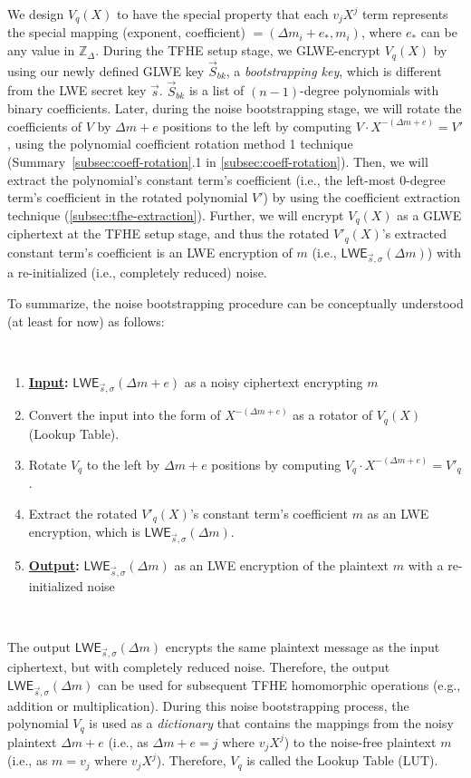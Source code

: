 We design $V_q(X)$ to have the special property that each $v_{j}X^{j}$ term represents the special mapping (exponent, coefficient) $= (\Delta m_i + e_{*}, m_i)$, where $e_*$ can be any value in $\mathbb{Z}_{\Delta}$. During the TFHE setup stage, we GLWE-encrypt $V_q(X)$ by using our newly defined GLWE key $\vec{S}_{bk}$, a \textit{bootstrapping key}, which is different from the LWE secret key $\vec{s}$. $\vec{S}_{bk}$ is a list of $(n-1)$-degree polynomials with binary coefficients. Later, during the noise bootstrapping stage, we will rotate the coefficients of $V$ by $\Delta m + e$ positions to the left by computing $V \cdot X^{-(\Delta m + e)} = V'$, using the polynomial coefficient rotation method 1 technique (Summary~\ref*{subsec:coeff-rotation}.1 in \autoref{subsec:coeff-rotation}). Then, we will extract the polynomial's constant term's coefficient (i.e., the left-most 0-degree term's coefficient in the rotated polynomial $V'$) by using the coefficient extraction technique (\autoref{subsec:tfhe-extraction}). Further, we will encrypt $V_q(X)$ as a GLWE ciphertext at the TFHE setup stage, and thus the rotated $V'_q(X)$'s extracted constant term's coefficient is an LWE encryption of $m$ (i.e., $\textsf{LWE}_{\vec{s}, \sigma}(\Delta m)$) with a re-initialized (i.e., completely reduced) noise. 

To summarize, the noise bootstrapping procedure can be conceptually understood (at least for now) as follows: 

$ $

\begin{enumerate}
\item \textbf{\underline{Input}:} $\textsf{LWE}_{\vec{s}, \sigma}(\Delta m + e)$ as a noisy ciphertext encrypting $m$
\item Convert the input into the form of $X^{-(\Delta m + e)}$ as a rotator of $V_q(X)$ (Lookup Table).
\item Rotate $V_q$ to the left by $\Delta m + e$ positions by computing $V_q \cdot X^{-(\Delta m + e)} = V'_q$.
\item Extract the rotated $V'_q(X)$'s constant term's coefficient $m$ as an LWE encryption, which is $\textsf{LWE}_{\vec{s}, \sigma}(\Delta m)$.
\item \textbf{\underline{Output}:} $\textsf{LWE}_{\vec{s}, \sigma}(\Delta m)$ as an LWE encryption of the plaintext $m$ with a re-initialized noise
\end{enumerate}

$ $

The output $\textsf{LWE}_{\vec{s}, \sigma}(\Delta m)$ encrypts the same plaintext message as the input ciphertext, but with completely reduced noise. Therefore, the output $\textsf{LWE}_{\vec{s}, \sigma}(\Delta m)$ can be used for subsequent TFHE homomorphic operations (e.g., addition or multiplication). During this noise bootstrapping process, the polynomial $V_q$ is used as a \textit{dictionary} that contains the mappings from the noisy plaintext $\Delta m + e$ (i.e., as $\Delta m + e = j$ where $v_jX^j$) to the noise-free plaintext $m$ (i.e., as $m = v_j$ where $v_jX^j$). Therefore, $V_q$ is called the Lookup Table (LUT).  

